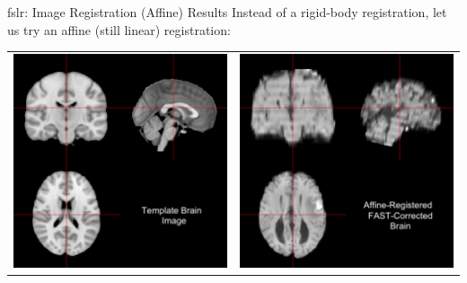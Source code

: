 \documentclass[11pt]{beamer}\usepackage[]{graphicx}\usepackage[]{color}
\begin{document}
\begin{frame}[fragile]{fslr: Image Registration (Affine) Results}
Instead of a rigid-body registration, let us try an affine (still linear) registration:
\begin{tabular}{cc}
\includegraphics[width=0.5\linewidth]{Template_Brain.png} & \includegraphics[width=0.5\linewidth]{FLIRT_Affine_Image_Brain.png}
\end{tabular}

\end{frame}
\end{document}
